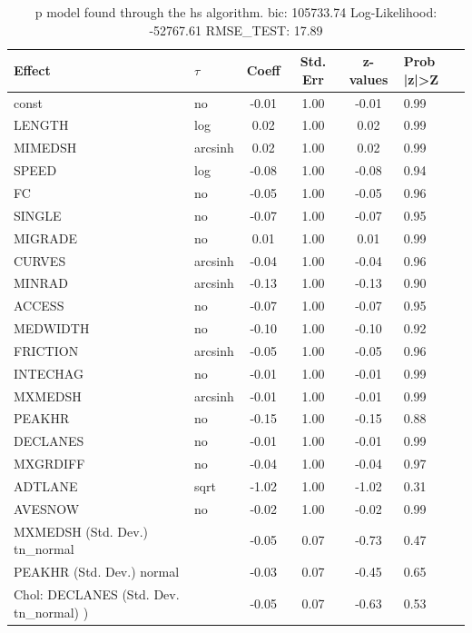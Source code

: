 \begin{table}
	\caption{p model found through the hs algorithm. bic: 105733.74 Log-Likelihood: -52767.61 RMSE_TEST: 17.89}
	\begin{center}
		\begin{tabular}{|l|l|c|c|c|l|}
			\hline
			Effect & $\tau$ & Coeff & Std. Err & z-values & Prob |z|>Z \\
			\hline
			const & no & -0.01 & 1.00 & -0.01 & 0.99 \\
			\hline
			LENGTH & log & 0.02 & 1.00 & 0.02 & 0.99 \\
			\hline
			MIMEDSH & arcsinh & 0.02 & 1.00 & 0.02 & 0.99 \\
			\hline
			SPEED & log & -0.08 & 1.00 & -0.08 & 0.94 \\
			\hline
			FC & no & -0.05 & 1.00 & -0.05 & 0.96 \\
			\hline
			SINGLE & no & -0.07 & 1.00 & -0.07 & 0.95 \\
			\hline
			MIGRADE & no & 0.01 & 1.00 & 0.01 & 0.99 \\
			\hline
			CURVES & arcsinh & -0.04 & 1.00 & -0.04 & 0.96 \\
			\hline
			MINRAD & arcsinh & -0.13 & 1.00 & -0.13 & 0.90 \\
			\hline
			ACCESS & no & -0.07 & 1.00 & -0.07 & 0.95 \\
			\hline
			MEDWIDTH & no & -0.10 & 1.00 & -0.10 & 0.92 \\
			\hline
			FRICTION & arcsinh & -0.05 & 1.00 & -0.05 & 0.96 \\
			\hline
			INTECHAG & no & -0.01 & 1.00 & -0.01 & 0.99 \\
			\hline
			MXMEDSH & arcsinh & -0.01 & 1.00 & -0.01 & 0.99 \\
			\hline
			PEAKHR & no & -0.15 & 1.00 & -0.15 & 0.88 \\
			\hline
			DECLANES & no & -0.01 & 1.00 & -0.01 & 0.99 \\
			\hline
			MXGRDIFF & no & -0.04 & 1.00 & -0.04 & 0.97 \\
			\hline
			ADTLANE & sqrt & -1.02 & 1.00 & -1.02 & 0.31 \\
			\hline
			AVESNOW & no & -0.02 & 1.00 & -0.02 & 0.99 \\
			\hline
			MXMEDSH (Std. Dev.) tn_normal &  & -0.05 & 0.07 & -0.73 & 0.47 \\
			\hline
			PEAKHR (Std. Dev.) normal &  & -0.03 & 0.07 & -0.45 & 0.65 \\
			\hline
			 Chol: DECLANES (Std. Dev. tn_normal) ) &  & -0.05 & 0.07 & -0.63 & 0.53 \\

\end{tabular}
\end{center}
\end{table}
